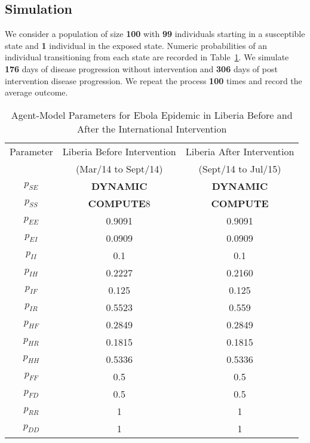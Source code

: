 \subsection{Simulation}We consider a population of size \textbf{100} with \textbf{99} individuals starting in a susceptible state and \textbf{1} individual in the exposed state. Numeric probabilities of an individual transitioning from each state are recorded in Table~\ref{tab:probabilities}. We simulate \textbf{176} days of disease progression without intervention and \textbf{306} days of post intervention disease progression. We repeat the process \textbf{100} times and record the average outcome.  
%
%
%
%
%
%
\begin{table}[ht]
\caption{Agent-Model Parameters for Ebola Epidemic in Liberia Before and After the International Intervention} %
\centering %
\begin{tabular}{c c c } 
\hline\hline %
Parameter & Liberia Before Intervention  & Liberia After Intervention \\ [0.5ex] 
 & (Mar/14 to Sept/14) &  (Sept/14 to Jul/15) \\ [0.5ex] %
\hline %
$p_{SE}$ & \textbf{DYNAMIC} & \textbf{DYNAMIC} \\ 
$p_{SS}$ & \textbf{COMPUTE}8 & \textbf{COMPUTE}  \\ 
$p_{EE}$ & 0.9091 & 0.9091  \\ 
$p_{EI}$ & 0.0909 & 0.0909  \\ 
$p_{II}$ & 0.1 & 0.1  \\ 
$p_{IH}$ & 0.2227 & 0.2160  \\ 
$p_{IF}$ & 0.125 & 0.125  \\ 
$p_{IR}$ & 0.5523 & 0.559  \\ 
$p_{HF}$ & 0.2849 & 0.2849 \\ 
$p_{HR}$ & 0.1815 & 0.1815 \\ 
$p_{HH}$ & 0.5336& 0.5336  \\ 
$p_{FF}$ & 0.5 & 0.5 \\ 
$p_{FD}$ & 0.5 & 0.5  \\ 
$p_{RR}$ & 1 & 1  \\ 
$p_{DD}$ & 1 & 1 \\ [1ex] 
\hline 
\end{tabular}
\label{tab:probabilities}
\end{table}
%
%
%
%
%
